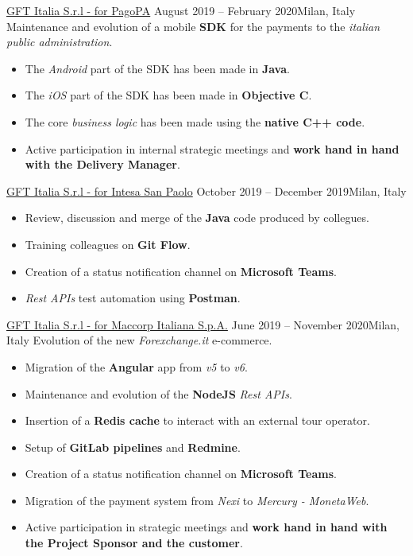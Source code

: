 \documentclass[10pt,a4paper]{altacv}
\begin{document}
\divider

{\href{https://www.pagopa.gov.it/}{GFT Italia S.r.l - for PagoPA}}
{August 2019 -- February 2020}{Milan, Italy}
Maintenance and evolution of a mobile \textbf{SDK} for the payments to the \textit{italian public administration}.
\newline
\begin{adjustwidth}{0cm}{-8cm}
\begin{itemize}
	\item The \textit{Android} part of the SDK has been made in \textbf{Java}.
	\item The \textit{iOS} part of the SDK has been made in \textbf{Objective C}.
	\item The core \textit{business logic} has been made using the \textbf{native C++ code}.
	\item Active participation in internal strategic meetings and \textbf{work hand in hand with the Delivery Manager}.
\end{itemize}

\divider

{\href{https://www.intesasanpaolo.com/}{GFT Italia S.r.l - for Intesa San Paolo}}
{October 2019 -- December 2019}{Milan, Italy}
\begin{itemize}
	\item Review, discussion and merge of the \textbf{Java} code produced by collegues.
	\item Training colleagues on \textbf{Git Flow}.
	\item Creation of a status notification channel on \textbf{Microsoft Teams}.
	\item \textit{Rest APIs} test automation using \textbf{Postman}.
\end{itemize}

\divider

{\href{https://www.forexchange.it/}{GFT Italia S.r.l - for Maccorp Italiana S.p.A.}}
{June 2019 -- November 2020}{Milan, Italy}
Evolution of the new \textit{Forexchange.it} e-commerce.
\newline 
\begin{itemize}
	\item Migration of the \textbf{Angular} app from \textit{v5} to \textit{v6}.
	\item Maintenance and evolution of the \textbf{NodeJS} \textit{Rest APIs}.
	\item Insertion of a \textbf{Redis cache} to interact with an external tour operator.
	\item Setup of \textbf{GitLab pipelines} and \textbf{Redmine}.
	\item Creation of a status notification channel on \textbf{Microsoft Teams}.
	\item Migration of the payment system from \textit{Nexi} to \textit{Mercury - MonetaWeb}.
	\item Active participation in strategic meetings and \textbf{work hand in hand with the Project Sponsor and the customer}.
\end{itemize}


\end{adjustwidth}
\end{document}
